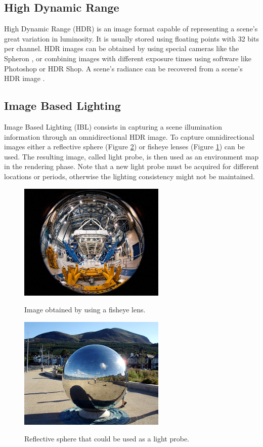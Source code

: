 \documentclass[conference]{acmsiggraph}
\begin{document}
\subsection{High Dynamic Range}

	High Dynamic Range (HDR) is an image format capable of representing a scene’s great variation in luminosity. It is usually stored using floating points with 32 bits per channel. 
	HDR images can be obtained by using special cameras like the Spheron \cite{spheron}, or combining images with different exposure times using software like Photoshop or HDR Shop. 
	A scene’s radiance can be recovered from a scene’s HDR image \cite{debevec1997}.

\subsection{Image Based Lighting}

	Image Based Lighting (IBL) \cite{debevec2002} consists in capturing a scene illumination information through an omnidirectional HDR image. To capture omnidirectional images either 
	a reflective sphere (Figure \ref{fig:lightprobe}\cite{linda2007}) or fisheye lenses (Figure \ref{fig:fisheye}\cite{salgado2010}) can be used. The resulting image, called light probe, is then used as an environment 
	map in the rendering phase. Note that a new light probe must be acquired for different locations or periods, otherwise the lighting consistency might not be maintained.

	\begin{figure}[!ht]
		\caption{Image obtained by using a fisheye lens.}
		\centering
		\includegraphics[width=7cm]{images/fisheye.jpg}
		\label{fig:fisheye}
	\end{figure}

	\begin{figure}[!ht]
		\caption{Reflective sphere that could be used as a light probe.}
		\centering
		\includegraphics[width=7cm]{images/lightprobe.jpg}
		\label{fig:lightprobe}
	\end{figure}
\end{document}
